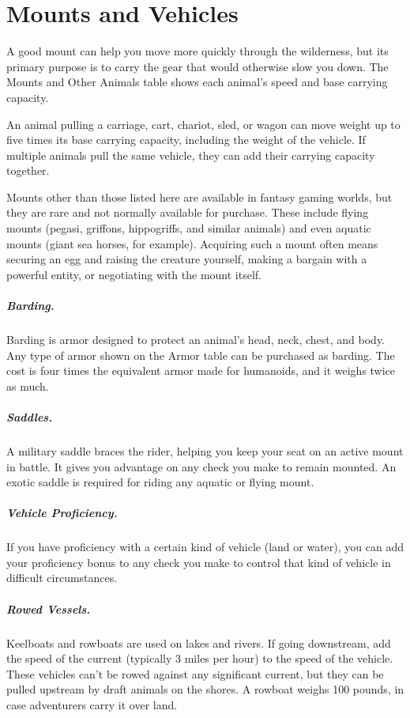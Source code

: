 \section{Mounts and Vehicles}

A good mount can help you move more quickly through the wilderness, but its primary purpose is to carry the gear that would otherwise slow you down. The Mounts and Other Animals table shows each animal's speed and base carrying capacity.

An animal pulling a carriage, cart, chariot, sled, or wagon can move weight up to five times its base carrying capacity, including the weight of the vehicle. If multiple animals pull the same vehicle, they can add their carrying capacity together.

Mounts other than those listed here are available in fantasy gaming worlds, but they are rare and not normally available for purchase. These include flying mounts (pegasi, griffons, hippogriffs, and similar animals) and even aquatic mounts (giant sea horses, for example). Acquiring such a mount often means securing an egg and raising the creature yourself, making a bargain with a powerful entity, or negotiating with the mount itself.

\subparagraph*{Barding.} Barding is armor designed to protect an animal's head, neck, chest, and body. Any type of armor shown on the Armor table can be purchased as barding. The cost is four times the equivalent armor made for humanoids, and it weighs twice as much.

\subparagraph*{Saddles.} A military saddle braces the rider, helping you keep your seat on an active mount in battle. It gives you advantage on any check you make to remain mounted. An exotic saddle is required for riding any aquatic or flying mount.

\subparagraph*{Vehicle Proficiency.} If you have proficiency with a certain kind of vehicle (land or water), you can add your proficiency bonus to any check you make to control that kind of vehicle in difficult circumstances.

\subparagraph*{Rowed Vessels.} Keelboats and rowboats are used on lakes and rivers. If going downstream, add the speed of the current (typically 3 miles per hour) to the speed of the vehicle. These vehicles can't be rowed against any significant current, but they can be pulled upstream by draft animals on the shores. A rowboat weighs 100 pounds, in case adventurers carry it over land.

